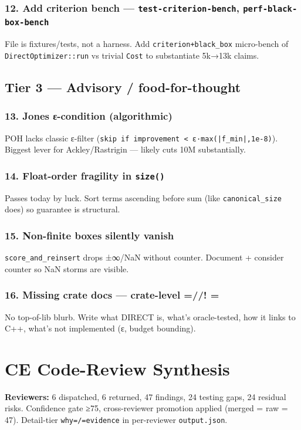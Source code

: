 \documentclass[11pt]{article}
\begin{document}
\subsubsection{12. Add criterion bench — \texttt{test-criterion-bench}, \texttt{perf-black-box-bench}}
\label{sec:orgce97339}
File is fixtures/tests, not a harness. Add \texttt{criterion+black\_box} micro-bench of \texttt{DirectOptimizer::run} vs trivial \texttt{Cost} to substantiate 5k→13k claims.
\subsection{Tier 3 — Advisory / food-for-thought}
\label{sec:orgc31ecae}

\subsubsection{13. Jones ε-condition (algorithmic)}
\label{sec:orgf221901}
POH lacks classic ε-filter (\texttt{skip if improvement < ε·max(|f\_min|,1e-8)}). Biggest lever for Ackley/Rastrigin — likely cuts 10M substantially.
\subsubsection{14. Float-order fragility in \texttt{size()}}
\label{sec:orgf81327e}
Passes today by luck. Sort terms ascending before sum (like \texttt{canonical\_size} does) so guarantee is structural.
\subsubsection{15. Non-finite boxes silently vanish}
\label{sec:orge213c58}
\texttt{score\_and\_reinsert} drops ±∞/NaN without counter. Document + consider counter so NaN storms are visible.
\subsubsection{16. Missing crate docs — crate-level =//! =}
\label{sec:org2906026}
No top-of-lib blurb. Write what DIRECT is, what's oracle-tested, how it links to C++, what's not implemented (ε, budget bounding).
\section{CE Code-Review Synthesis}
\label{sec:org8e90261}
\textbf{\textbf{Reviewers:}} 6 dispatched, 6 returned, 47 findings, 24 testing gaps, 24 residual risks. Confidence gate ≥75, cross-reviewer promotion applied (merged = raw = 47). Detail-tier \texttt{why=/=evidence} in per-reviewer \texttt{output.json}.
\end{document}
